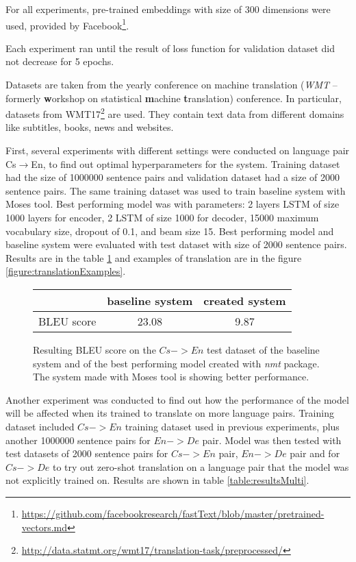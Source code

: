 \documentclass{ExcelAtFIT}
\begin{document}
For all experiments, pre-trained embeddings with size of 300 dimensions were used, provided by Facebook\footnote{\url{https://github.com/facebookresearch/fastText/blob/master/pretrained-vectors.md}}.

Each experiment ran until the result of loss function for validation dataset did not decrease for 5 epochs.

Datasets are taken from the yearly conference on machine translation (\emph{WMT} -- formerly \textbf{w}orkshop on statistical \textbf{m}achine \textbf{t}ranslation) conference. In particular, datasets from WMT17\footnote{\url{http://data.statmt.org/wmt17/translation-task/preprocessed/}} are used. They contain text data from different domains like subtitles, books, news and websites.

First, several experiments with different settings were conducted on language pair Cs$\rightarrow$En, to find out optimal hyperparameters for the system. Training dataset had the size of 1000000 sentence pairs and validation dataset had a size of 2000 sentence pairs. The same training dataset was used to train baseline system with Moses tool. Best performing model was with parameters: 2 layers LSTM of size 1000 layers for encoder, 2 LSTM of size 1000 for decoder, 15000 maximum vocabulary size, dropout of 0.1, and beam size 15. Best performing model and baseline system were evaluated with test dataset with size of 2000 sentence pairs. Results are in the table \ref{table:results} and examples of translation are in the figure \ref{figure:translationExamples}.

\begin{figure}[h!]
    \begin{center}
        \begin{tabular}{c|c|c}
          & baseline system & created system \\
          \hline
          BLEU score & 23.08 & 9.87 \\
          \hline
        \end{tabular}
    \end{center}
	\caption{Resulting BLEU score on the $Cs->En$ test dataset of the baseline system and of the best performing model created with \emph{nmt} package. The system made with Moses tool is showing better performance.}
	\label{table:results}
\end{figure}


Another experiment was conducted to find out how the performance of the model will be affected when its trained to translate on more language pairs. Training dataset included $Cs->En$ training dataset used in previous experiments, plus another 1000000 sentence pairs for $En->De$ pair. Model was then tested with test datasets of 2000 sentence pairs for $Cs->En$ pair, $En->De$ pair and for $Cs->De$ to try out zero-shot translation on a language pair that the model was not explicitly trained on. Results are shown in table \ref{table:resultsMulti}.
\end{document}
